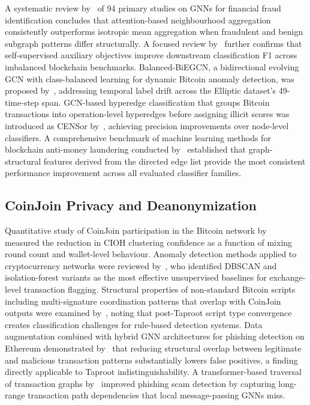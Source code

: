 \documentclass[12pt,a4paper]{article}
\begin{document}
A systematic review by~\citet{motie2024} of 94 primary
studies on GNNs for financial fraud identification concludes
that attention-based neighbourhood aggregation consistently
outperforms isotropic mean aggregation when fraudulent and
benign subgraph patterns differ structurally. A focused review
by~\citet{fan2024gnn} further confirms that self-supervised
auxiliary objectives improve downstream classification F1
across imbalanced blockchain benchmarks. Balanced-BiEGCN,
a bidirectional evolving GCN with class-balanced learning
for dynamic Bitcoin anomaly detection, was proposed
by~\citet{xiao2025}, addressing temporal label drift across
the Elliptic dataset's 49-time-step span. GCN-based hyperedge
classification that groups Bitcoin transactions into
operation-level hyperedges before assigning illicit scores
was introduced as CENSor by~\citet{lee2024}, achieving
precision improvements over node-level classifiers. A
comprehensive benchmark of machine learning methods for
blockchain anti-money laundering conducted by~\citet{lo2023}
established that graph-structural features derived from the
directed edge list provide the most consistent performance
improvement across all evaluated classifier families.

\subsection{CoinJoin Privacy and Deanonymization}

Quantitative study of CoinJoin participation in the Bitcoin
network by~\citet{coinjoin2024tdsc} measured the reduction
in CIOH clustering confidence as a function of mixing round
count and wallet-level behaviour. Anomaly detection methods
applied to cryptocurrency networks were reviewed
by~\citet{futureinternet2025}, who identified DBSCAN and
isolation-forest variants as the most effective unsupervised
baselines for exchange-level transaction flagging. Structural
properties of non-standard Bitcoin scripts including
multi-signature coordination patterns that overlap with
CoinJoin outputs were examined by~\citet{kiani2024}, noting
that post-Taproot script type convergence creates
classification challenges for rule-based detection systems.
Data augmentation combined with hybrid GNN architectures for
phishing detection on Ethereum demonstrated by~\citet{chen2024}
that reducing structural overlap between legitimate and
malicious transaction patterns substantially lowers false
positives, a finding directly applicable to Taproot
indistinguishability. A transformer-based traversal of
transaction graphs by~\citet{choi2024} improved phishing
scam detection by capturing long-range transaction path
dependencies that local message-passing GNNs miss.
\end{document}
